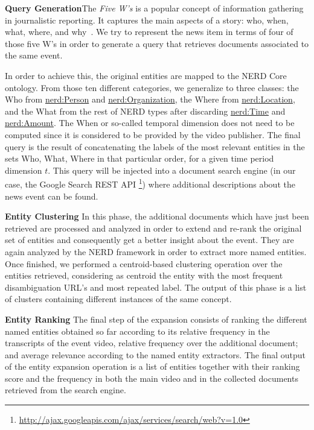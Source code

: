 \documentclass{llncs}
\begin{document}
\textbf{Query Generation}The \emph{Five W's} is a popular concept of information gathering in journalistic reporting. It captures the main aspects of a story: who, when, what, where, and why~\cite{LiJia2007}. We try to represent the news item in terms of four of those five W's in order to generate a query that retrieves documents associated to the same event.

In order to achieve this, the original entities are mapped to the NERD Core ontology. From those ten different categories, we generalize to three classes: the Who from \url{nerd:Person} and \url{nerd:Organization}, the Where from \url{nerd:Location}, and the What from the rest of NERD types after discarding \url{nerd:Time} and \url{nerd:Amount}. The When or so-called temporal dimension does not need to be computed since it is considered to be provided by the video publisher. The final query is the result of concatenating the labels of the most relevant entities in the sets Who, What, Where in that particular order, for a given time period dimension $t$.  
This query will be injected into a document search engine (in our case, the Google Search REST API \footnote{\fontsize{8pt}{1em}\selectfont  \url{http://ajax.googleapis.com/ajax/services/search/web?v=1.0}}) where additional descriptions about the news event can be found.

\textbf{Entity Clustering}
In this phase, the additional documents which have just been retrieved are processed and analyzed in order to extend and re-rank the original set of entities and consequently get a better insight about the event. They are again analyzed by the NERD framework in order to extract more named entities. Once finished, we performed a centroid-based clustering operation over the entities retrieved, considering as centroid the entity with the most frequent disambiguation URL's and most repeated label. The output of this phase is a list of clusters containing different instances of the same concept.

\textbf{Entity Ranking}
The final step of the expansion consists of ranking the different named entities obtained so far according to its relative frequency in the transcripts of the event video, relative frequency over the additional document; and average relevance according to the named entity extractors. The final output of the entity expansion operation is a list of entities together with their ranking score and the frequency in both the main video and in the collected documents retrieved from the search engine.
\end{document}
